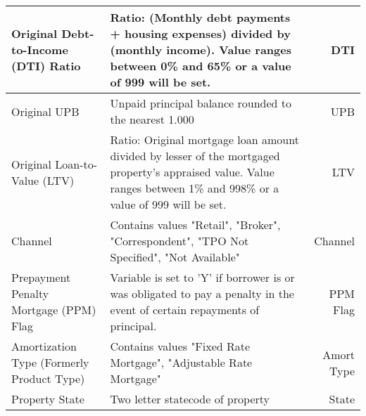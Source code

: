 \begin{longtable}{ Lp{8cm}R }
Original Debt-to-Income (DTI) Ratio       & Ratio: (Monthly debt payments + housing expenses) divided by (monthly income). Value ranges between 0\% and 65\% or a value of 999 will be set.                                                                                                                                      & DTI                \\\hline
Original UPB                              & Unpaid principal balance rounded to the nearest 1.000                                                                                                                                                                                                                                & UPB                \\\hline
Original Loan-to-Value (LTV)              & Ratio: Original mortgage loan amount divided by lesser of the mortgaged property’s appraised value. Value ranges between 1\% and 998\% or a value of 999 will be set.                                                                                                                & LTV                \\\hline
Channel                                   & Contains values "Retail", "Broker", "Correspondent", "TPO Not Specified",  "Not Available"                                                                                                                                                                                           & Channel            \\\hline
Prepayment Penalty Mortgage (PPM) Flag    & Variable is set to 'Y' if borrower is or was obligated to pay a penalty in the event of certain repayments of principal.                                                                                                                                                             & PPM Flag           \\\hline
Amortization Type (Formerly Product Type) & Contains values "Fixed Rate Mortgage",  "Adjustable Rate Mortgage"                                                                                                                                                                                                                   & Amort Type         \\\hline
Property State                            & Two letter statecode of property                                                                                                                                                                                                                                                     & State              \\\hline

\end{longtable}
